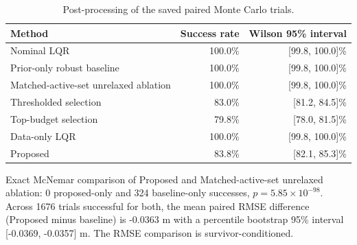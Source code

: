 \begin{table}[t]
\centering
\caption{Post-processing of the saved paired Monte Carlo trials.}
\label{tab:mc_postprocessing}
\footnotesize
\begin{tabular}{lrr}
\toprule
Method & Success rate & Wilson 95\% interval \\
\midrule
Nominal LQR & 100.0\% & [99.8, 100.0]\% \\
Prior-only robust baseline & 100.0\% & [99.8, 100.0]\% \\
Matched-active-set unrelaxed ablation & 100.0\% & [99.8, 100.0]\% \\
Thresholded selection & 83.0\% & [81.2, 84.5]\% \\
Top-budget selection & 79.8\% & [78.0, 81.5]\% \\
Data-only LQR & 100.0\% & [99.8, 100.0]\% \\
Proposed & 83.8\% & [82.1, 85.3]\% \\
\bottomrule
\end{tabular}
\par\smallskip
\begin{minipage}{0.96\linewidth}\scriptsize Exact McNemar comparison of Proposed and Matched-active-set unrelaxed ablation: 0 proposed-only and 324 baseline-only successes, $p=5.85\times10^{-98}$. Across 1676 trials successful for both, the mean paired RMSE difference (Proposed minus baseline) is -0.0363 m with a percentile bootstrap 95\% interval [-0.0369, -0.0357] m. The RMSE comparison is survivor-conditioned.\end{minipage}
\end{table}
